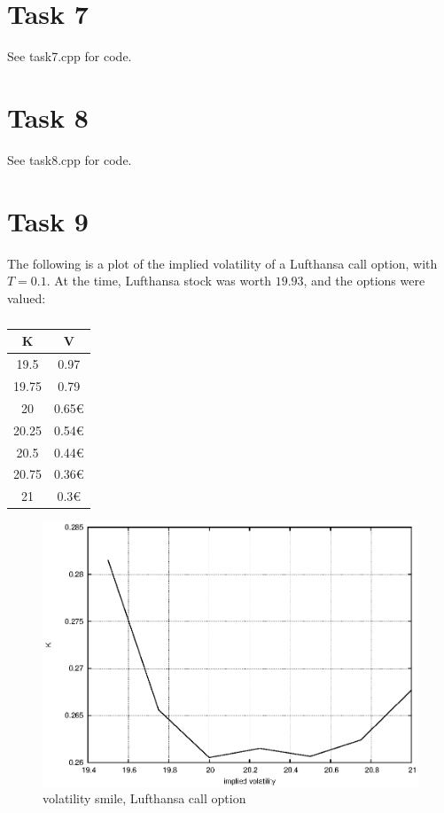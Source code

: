 \documentclass[]{article}
\begin{document}
\section*{Task 7}
See task7.cpp for code.

\section*{Task 8}
See task8.cpp for code.

\section*{Task 9}
The following is a plot of the implied volatility of a Lufthansa call option, with $T=0.1$. At the time, Lufthansa stock was worth $19.93$, and the options were valued:\\

\begin{table}
\centering
\begin{tabular}[ht]{c|c}
K & V\\
\hline
19.5&0.97\\
19.75&0.79\\
20&0.65€\\
20.25&0.54€\\
20.5&0.44€\\
20.75&0.36€\\
21&0.3€\\
\end{tabular}
\caption{}
\end{table}



\begin{figure}[!ht]
\centering
\includegraphics[width=.9\textwidth]{task9.eps}
\caption{volatility smile, Lufthansa call option}
\label{fig:Task9}
\end{figure}
\end{document}
